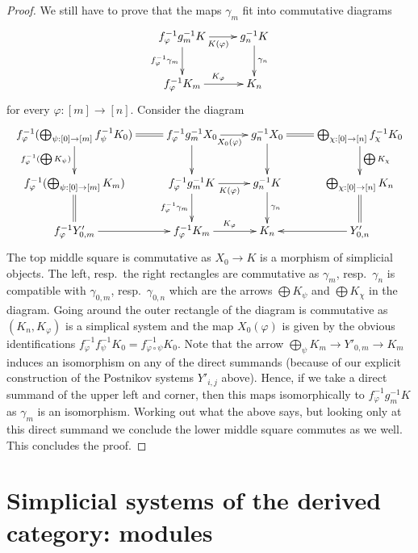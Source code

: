 \documentclass{stacks-project}
\theoremstyle{plain}
\theoremstyle{definition}
\theoremstyle{remark}
\numberwithin{equation}{subsection}
\begin{document}
\begin{proof}
\medskip\noindent
We still have to prove that the maps $\gamma_m$ fit into commutative diagrams
$$
\xymatrix{
f_\varphi^{-1}g_m^{-1}K \ar[d]_{f_\varphi^{-1}\gamma_m} \ar[r]_{K(\varphi)} &
g_n^{-1}K \ar[d]^{\gamma_n} \\
f_\varphi^{-1}K_m \ar[r]^{K_\varphi} &
K_n
}
$$
for every $\varphi : [m] \to [n]$. Consider the diagram
$$
\xymatrix{
f_\varphi^{-1}(\bigoplus_{\psi : [0] \to [m]} f_\psi^{-1}K_0)
\ar@{=}[r] \ar[d]_{f_\varphi^{-1}(\bigoplus K_\psi)} &
f_\varphi^{-1}g_m^{-1}X_0 \ar[d] \ar[r]_{X_0(\varphi)} &
g_n^{-1}X_0 \ar[d] &
\bigoplus_{\chi : [0] \to [n]} f_\chi^{-1}K_0
\ar@{=}[l] \ar[d]^{\bigoplus K_\chi} \\
f_\varphi^{-1}(\bigoplus_{\psi : [0] \to [m]} K_m) \ar@{=}[d] &
f_\varphi^{-1}g_m^{-1}K \ar[d]_{f_\varphi^{-1}\gamma_m} \ar[r]_{K(\varphi)} &
g_n^{-1}K \ar[d]^{\gamma_n} &
\bigoplus_{\chi : [0] \to [n]} K_n \ar@{=}[d] \\
f_\varphi^{-1}Y'_{0, m} \ar[r] &
f_\varphi^{-1}K_m \ar[r]^{K_\varphi} &
K_n &
Y'_{0, n} \ar[l]
}
$$
The top middle square is commutative as $X_0 \to K$ is a morphism
of simplicial objects. The left, resp.\ the right rectangles are
commutative as $\gamma_m$, resp.\ $\gamma_n$ is compatible with
$\gamma_{0, m}$, resp.\ $\gamma_{0, n}$ which are the arrows
$\bigoplus K_\psi$ and $\bigoplus K_\chi$ in the diagram.
Going around the outer rectangle of the diagram
is commutative as $(K_n, K_\varphi)$ is a simplical system
and the map $X_0(\varphi)$ is given by the obvious identifications
$f_\varphi^{-1}f_\psi^{-1}K_0 = f_{\varphi \circ \psi}^{-1}K_0$.
Note that the arrow $\bigoplus_\psi K_m \to Y'_{0, m} \to K_m$
induces an isomorphism on any of the direct summands
(because of our explicit construction of the Postnikov
systems $Y'_{i, j}$ above).
Hence, if we take a direct summand of
the upper left and corner, then this maps isomorphically to
$f_\varphi^{-1}g_m^{-1}K$ as $\gamma_m$ is an isomorphism.
Working out what the above says,
but looking only at this direct summand we conclude the lower
middle square commutes as we well. This concludes the proof.
\end{proof}









\section{Simplicial systems of the derived category: modules}
\label{section-glueing-modules}
\end{document}
